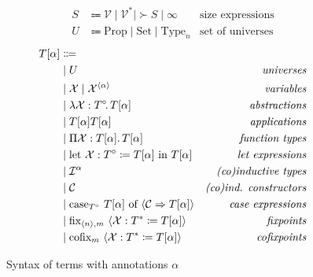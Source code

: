 \begin{figure}
\centering
\begin{align*}
S &\Coloneqq \mathcal{V} \mid \mathcal{V}^* \mid \succ{S} \mid \infty &\text{size expressions} \\
U &\Coloneqq \text{Prop} \mid \text{Set} \mid \text{Type}_n &\text{set of universes}
\end{align*}
\begin{align*}
T[\alpha] &\Coloneqq \\
    &\mid U
        &\textit{universes}\\
    &\mid \mathcal{X} \mid \mathcal{X}^{\langle\alpha\rangle}
        &\textit{variables} \\
    &\mid \lambda \mathcal{X} : T^\circ\! \mathpunct{.} T[\alpha]
        &\textit{abstractions} \\
    &\mid T[\alpha] T[\alpha]
        &\textit{applications} \\
    &\mid \Pi \mathcal{X} : T[\alpha] \mathpunct{.} T[\alpha]
        &\textit{function types} \\
    &\mid \text{let} ~ \mathcal{X} : T^\circ \coloneqq T[\alpha]  ~ \text{in} ~ T[\alpha]
        &\textit{let expressions} \\
    &\mid \mathcal{I}^\alpha
        &\textit{(co)inductive types} \\
    &\mid \mathcal{C}
        &\textit{(co)ind. constructors} \\
    &\mid \text{case}_{T^\circ}  ~ T[\alpha]  ~ \text{of}  ~ \langle\mathcal{C} \Rightarrow T[\alpha]\rangle
        &\textit{case expressions} \\
    &\mid \text{fix}_{\langle n\rangle, m}  ~ \langle\mathcal{X}: T^* \coloneqq T[\alpha]\rangle
        &\textit{fixpoints} \\
    &\mid \text{cofix}_{m}  ~ \langle\mathcal{X}: T^* \coloneqq T[\alpha]\rangle
        &\textit{cofixpoints}
\end{align*}
\caption{Syntax of \lang terms with annotations $\alpha$}
\label{fig:terms-general}
\end{figure}
